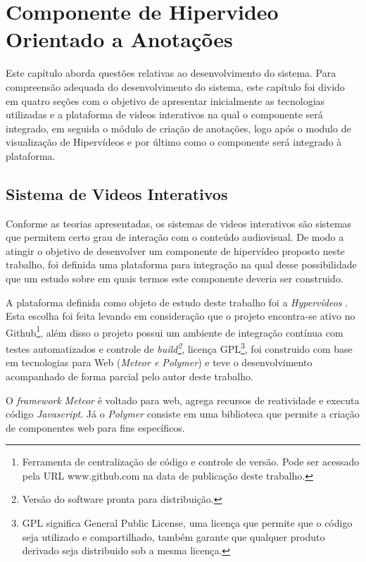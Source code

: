 \chapter[Componente de Hipervideo Orientado a Anotações]{Componente de Hipervideo Orientado a Anotações}

Este capítulo aborda questões relativas ao desenvolvimento do sistema. Para compreensão adequada do desenvolvimento do sistema, este capítulo foi divido em quatro seções com o objetivo de apresentar inicialmente as tecnologias utilizadas e a plataforma de videos interativos na qual o componente será integrado, em seguida o módulo de criação de anotações, logo após o modulo de visualização de Hipervídeos e por último como o componente será integrado à plataforma.

\section{Sistema de Videos Interativos}

Conforme as teorias apresentadas, os sistemas de videos interativos são sistemas que permitem certo grau de interação com o conteúdo audiovisual. De modo a atingir o objetivo de desenvolver um componente de hipervídeo proposto neste trabalho, foi definida uma plataforma para integração na qual desse possibilidade que um estudo sobre em quais termos este componente deveria ser construido.

A plataforma definida como objeto de estudo deste trabalho foi a \textit{Hypervídeos} \cite{arthurtcc}. Esta escolha foi feita levando em consideração que o projeto encontra-se ativo no Github\footnote{Ferramenta de centralização de código e controle de versão. Pode ser acessado pela URL www.github.com na data de publicação deste trabalho.}, além disso o projeto possui um ambiente de integração contínua com testes automatizados e controle de \textit{build\footnote{Versão do software pronta para distribuição.}}, licença GPL\footnote{GPL significa General Public License, uma licença que permite que o código seja utilizado e compartilhado, também garante que qualquer produto derivado seja distribuido sob a mesma licença.}, foi construido com base em tecnologias para Web (\textit{Meteor e Polymer}) e teve o desenvolvimento acompanhado de forma parcial pelo autor deste trabalho.

O \textit{framework} \textit{Meteor} é voltado para web, agrega recursos de reatividade e executa código \textit{Javascript}. Já o \textit{Polymer} consiste em uma biblioteca que permite a criação de componentes web para fins específicos.

